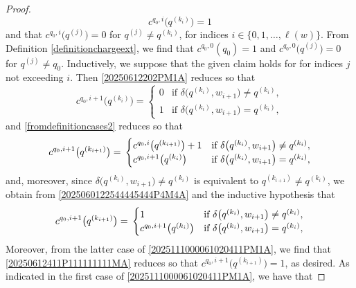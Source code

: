 \documentclass[10pt,a4paper]{amsart}
\begin{document}
\begin{proof}
\begin{equation}
 c^{q_0, i}\big( q^{(k_i)} \big) = 1
\end{equation}
 and that $c^{q_0, i}\big( q^{(j)} \big) = 0$ for $q^{(j)} \neq q^{(k_i)}$, 
 for indices $i \in \{ 0, 1, \ldots, \ell(w) \}$. 
 From Definition \ref{definitionchargeext}, 
 we find that 
 $c^{q_0, 0}(q_0) = 1$ and $c^{q_0, 0}\big( q^{(j)} \big) = 0$ 
 for $q^{(j)} \neq q_0$. Inductively, we suppose that the given claim holds for for indices $j$ not exceeding $i$. 
 Then \eqref{20250612202PM1A} reduces so that 
\begin{equation}\label{2025111000061020411PM1A}
 c^{q_0, i+1}\big( q^{(k_{i})} \big) = 
 \begin{cases} 
 0 & \text{if $\delta\big( q^{(k_i)}, w_{i+1} \big) \neq q^{(k_i)} $}, \\ 
 1 
 & \text{if $\delta\big( q^{(k_i)}, w_{i+1} \big) = q^{(k_i)} $}, 
 \end{cases} 
\end{equation}
 and \eqref{fromdefinitioncases2} reduces so that 
\begin{equation}\label{2025060122544445444P4M4A}
 c^{q_0, i+1}\big( q^{(k_{i+1})} \big) = \\ 
 \begin{cases} 
 c^{q_0, i}\big( q^{(k_{i+1})} \big) + 1 
 & \text{if $\delta\big( q^{(k_i)}, w_{i+1} \big) \neq q^{(k_i)} $}, \\ 
 c^{q_0, i+1}\big( q^{(k_i)} \big) & \text{if $\delta\big( q^{(k_i)}, w_{i+1} \big) = q^{(k_i)} $}, 
 \end{cases} 
\end{equation}
 and, moreover, since $\delta\big( q^{(k_i)}, w_{i+1} \big) \neq q^{(k_i)}$
 is equivalent to $q^{(k_{i+1})} \neq q^{(k_i)}$, we obtain from 
 \eqref{2025060122544445444P4M4A} and the inductive hypothesis that 
\begin{equation}\label{20250612411P111111111MA}
 c^{q_0, i+1}\big( q^{(k_{i+1})} \big) = \\ 
 \begin{cases} 
 1 
 & \text{if $\delta\big( q^{(k_i)}, w_{i+1} \big) \neq q^{(k_i)} $}, \\ 
 c^{q_0, i+1}\big( q^{(k_i)} \big) & \text{if $\delta\big( q^{(k_i)}, w_{i+1} \big) = q^{(k_i)} $}, 
 \end{cases} 
\end{equation}
 Moreover, from the latter case of \eqref{2025111000061020411PM1A}, 
 we find that \eqref{20250612411P111111111MA} reduces so that 
 $ c^{q_0, i+1}\big( q^{(k_{i+1})} \big) = 1$, 
 as desired. As indicated in the first case of \eqref{2025111000061020411PM1A}, we have that 

\end{proof}
\end{document}
